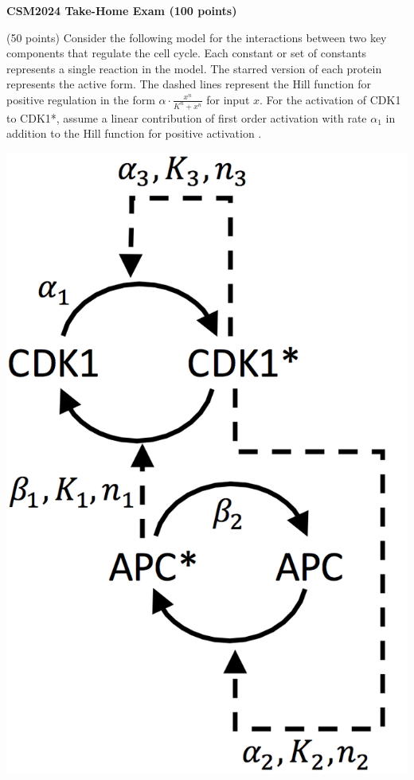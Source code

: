 \documentclass{exam}
\begin{document}
{\LARGE\bf CSM2024 Take-Home Exam (100 points)}
\vspace{10mm}

\vspace{5mm}

\begin{questions}

\begin{question}(50 points) Consider the following model for the interactions between two key components that regulate the cell cycle. Each constant or set of constants represents a single reaction in the model. The starred version of each protein represents the active form. The dashed lines represent the Hill function for positive regulation in the form $\alpha\cdot\frac{x^n}{K^n+x^n}$ for input $x$. For the activation of CDK1 to CDK1*, assume a linear contribution of first order activation with rate $\alpha_1$ in addition to the Hill function for positive activation .

\begin{center}
\includegraphics{CDK1-APC-model.png}
\end{center}


\end{question}
\end{questions}
\end{document}
